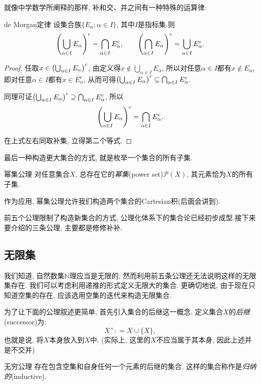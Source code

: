就像中学数学所阐释的那样, 补和交、并之间有一种特殊的运算律: 

\begin{theorem}{de Morgan定律}
	设集合族$\{ E_{\alpha} :  \alpha \in I \}$, 其中$I$是指标集.则$$\left( \bigcup_{\alpha \in I}E_{\alpha}  \right)^c = \bigcap_{\alpha \in I} E_{\alpha}^c, \qquad \left( \bigcap_{\alpha \in I}E_{\alpha}  \right)^c = \bigcup_{\alpha \in I} E_{\alpha}^c.$$
\end{theorem}
\begin{proof}
	任取$x \in \left( \bigcup_{\alpha \in I}E_{\alpha}  \right)^c$, 由定义得$x \notin \bigcup_{\alpha \in I}E_{\alpha}$, 所以对任意$\alpha \in I$都有$x \notin E_{\alpha}$, 即对任意$\alpha \in I$都有$x \in E_{\alpha}^c$, 从而可得$\left( \bigcup_{\alpha \in I}E_{\alpha}  \right)^c \subseteq \bigcap_{\alpha \in I} E_{\alpha}^c$.
	
	同理可证$\left( \bigcup_{\alpha \in I}E_{\alpha}  \right)^c \supseteq \bigcap_{\alpha \in I} E_{\alpha}^c$, 所以$$\left( \bigcup_{\alpha \in I}E_{\alpha}  \right)^c = \bigcap_{\alpha \in I} E_{\alpha}^c.$$
	
	在上式左右同取补集, 立得第二个等式.
\end{proof}

最后一种构造更大集合的方式, 就是枚举一个集合的所有子集.

\begin{axiom}{幂集公理}
	对任意集合$X$, 总存在它的\textit{幂集}(power set)$\mathcal{P}(X)$, 其元素恰为$X$的所有子集.
\end{axiom}

作为应用, 幂集公理允许我们构造两个集合的Cartesian积(后面会讲到). 

前五个公理限制了构造新集合的方式, 公理化体系下的集合论已经初步成型.接下来要介绍的三条公理, 主要都是修修补补. 

\subsection{无限集}

我们知道, 自然数集$\mathbb{N}$理应当是无限的, 然而利用前五条公理还无法说明这样的无限集存在. 我们可以考虑利用递推的形式定义无限大的集合. 更确切地说, 由于现在只知道空集的存在, 应该选用空集的迭代来构造无限集合. 

为了让下面的公理叙述更简单, 首先引入集合的后继这一概念. 定义集合$X$的\textit{后继}(successor)为: $$X^{+} : = X \cup \{ X \}, $$
也就是说, 将$X$本身放入到$X$中. (实际上, 这里的$X$不应当属于其本身, 因此上述并是不交并)

\begin{axiom}{无穷公理}
	存在包含空集和自身任何一个元素的后继的集合. 这样的集合称作是\textit{归纳的}(inductive). 
\end{axiom}

